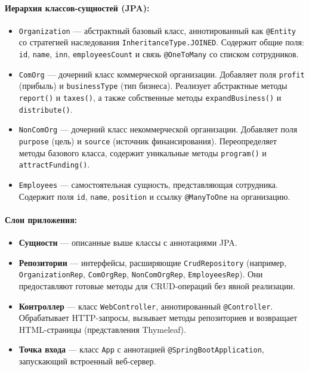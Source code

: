 \documentclass[oneside,a4paper,14pt]{extarticle}
\begin{document}
\paragraph{Иерархия классов-сущностей (JPA):}
\begin{itemize}
	\item \texttt{Organization} — абстрактный базовый класс, аннотированный как \texttt{@Entity} со стратегией наследования \texttt{InheritanceType.JOINED}. Содержит общие поля: \texttt{id}, \texttt{name}, \texttt{inn}, \texttt{employeesCount} и связь \texttt{@OneToMany} со списком сотрудников.
	\item \texttt{ComOrg} — дочерний класс коммерческой организации. Добавляет поля \texttt{profit} (прибыль) и \texttt{businessType} (тип бизнеса). Реализует абстрактные методы \texttt{report()} и \texttt{taxes()}, а также собственные методы \texttt{expandBusiness()} и \texttt{distribute()}.
	\item \texttt{NonComOrg} — дочерний класс некоммерческой организации. Добавляет поля \texttt{purpose} (цель) и \texttt{source} (источник финансирования). Переопределяет методы базового класса, содержит уникальные методы \texttt{program()} и \texttt{attractFunding()}.
	\item \texttt{Employees} — самостоятельная сущность, представляющая сотрудника. Содержит поля \texttt{id}, \texttt{name}, \texttt{position} и ссылку \texttt{@ManyToOne} на организацию.
\end{itemize}

\newpage

\paragraph{Слои приложения:}
\begin{itemize}

	\item \textbf{Сущности} — описанные выше классы с аннотациями JPA.

    \item \textbf{Репозитории} — интерфейсы, расширяющие \texttt{CrudRepository} (например, \texttt{OrganizationRep}, \texttt{ComOrgRep}, \texttt{NonComOrgRep}, \texttt{EmployeesRep}). Они предоставляют готовые методы для CRUD-операций без явной реализации.

    \item \textbf{Контроллер} — класс \texttt{WebController}, аннотированный \texttt{@Controller}. Обрабатывает HTTP-запросы, вызывает методы репозиториев и возвращает HTML-страницы (представления Thymeleaf).

    \item \textbf{Точка входа} — класс \texttt{App} с аннотацией \texttt{@SpringBootApplication}, запускающий встроенный веб-сервер.

\end{itemize}
\end{document}
